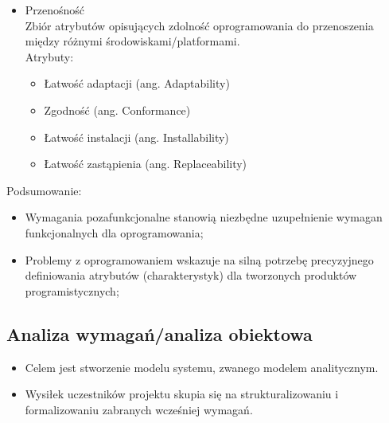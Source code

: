 \documentclass[a4paper]{article}
\begin{document}
\begin{itemize}
\begin{itemize}
    \end{itemize}
    \item Przenośność\\
Zbiór atrybutów opisujących zdolność
oprogramowania do przenoszenia między
różnymi środowiskami/platformami.\\
Atrybuty:
    \begin{itemize}
        \item Łatwość adaptacji (ang. Adaptability)
        \item Zgodność (ang. Conformance)
        \item Łatwość instalacji (ang. Installability)
        \item Łatwość zastąpienia (ang. Replaceability)
    \end{itemize}
\end{itemize}


Podsumowanie:
\begin{itemize}
    \item Wymagania pozafunkcjonalne stanowią niezbędne
uzupełnienie wymagan funkcjonalnych dla
oprogramowania;
\item Problemy z oprogramowaniem wskazuje na silną
potrzebę precyzyjnego definiowania atrybutów
(charakterystyk) dla tworzonych produktów
programistycznych;
\end{itemize}

\subsection{Analiza wymagań/analiza obiektowa}
\begin{itemize}
    \item Celem jest stworzenie modelu systemu, zwanego
modelem analitycznym.
    \item Wysiłek uczestników projektu skupia się na
strukturalizowaniu i formalizowaniu zabranych
wcześniej wymagań.
\end{itemize}
\end{document}
